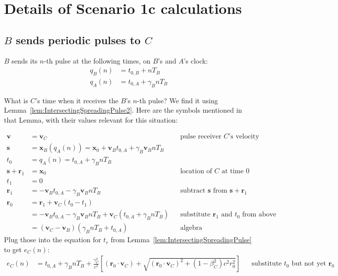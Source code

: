 \documentclass[a4paper]{article}
\theoremstyle{plain}
\theoremstyle{definition}
\newcommand{\vect}[1]{\mathbf{#1}}
\begin{document}
\section{Details of Scenario 1c calculations}
\label{app:scen1c}


\subsection{$B$ sends periodic pulses to $C$}
\label{app:scen1c-Bsending}

$B$ sends its $n$-th pulse at the following times, on $B$'s and $A$'s
clock:
\begin{align}
q_B(n) & = t_{0,B} + nT_B \\
q_A(n) & = t_{0,A} + \gamma_B nT_B
\end{align}

What is $C$'s time when it receives the $B$'s $n$-th pulse?  We find
it using Lemma~\ref{lem:IntersectingSpreadingPulse2}.  Here are the
symbols mentioned in that Lemma, with their values relevant for this
situation:

\begin{align*}
\vect{v} & = \vect{v}_C & & \text{pulse receiver $C$'s velocity} \\
\vect{s} & = \vect{x}_B(q_A(n)) = \vect{x}_0 + \vect{v}_B t_{0,A} + \gamma_B \vect{v}_B n T_B  & & \text{} \\
t_0 & = q_A(n) = t_{0,A} + \gamma_B nT_B & & \text{} \\
\vect{s} + \vect{r}_1 & = \vect{x}_0 & & \text{location of $C$ at time 0} \\
t_1 & = 0 \\
\vect{r}_1 & = - \vect{v}_B t_{0,A} - \gamma_B \vect{v}_B n T_B & & \text{subtract $\vect{s}$ from $\vect{s}+\vect{r}_1$} \\
\vect{r}_0
  & = \vect{r}_1 + \vect{v}_C(t_0-t_1) \\
  & = - \vect{v}_B t_{0,A} - \gamma_B \vect{v}_B n T_B + \vect{v}_C (t_{0,A} + \gamma_B nT_B) & & \text{substitute $\vect{r}_1$ and $t_0$ from above} \\
  & = (\vect{v}_C - \vect{v}_B) (\gamma_B n T_B + t_{0,A}) & & \text{algebra}
\end{align*}
Plug those into the equation for $t_r$ from
Lemma~\ref{lem:IntersectingSpreadingPulse} to get $e_{C}(n)$:
\begin{align*}
e_{C}(n) & = t_{0,A} + \gamma_B nT_B + \frac{\gamma_C^2}{c^2} \left[ (\vect{r}_0 \cdot \vect{v}_C) + \sqrt{(\vect{r}_0 \cdot \vect{v}_C)^2 + (1-\beta_C^2)c^2 r_0^2} \right] & & \text{substitute $t_0$ but not yet $\vect{r}_0$}
\end{align*}
\end{document}
